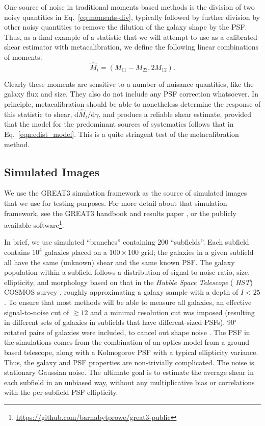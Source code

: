 \documentclass[iop]{emulateapj}
\begin{document}
One source of noise in traditional moments based methods is the
division of two noisy quantities in Eq.~\ref{eq:moments-div},
typically followed by further division by other noisy quantities to
remove the dilution of the galaxy shape by the PSF.  Thus, as a final
example of a statistic that we will attempt to use as a calibrated
shear estimator with metacalibration, we define the following linear
combinations of moments:
\begin{equation}
\hat{M}_i = (M_{11}-M_{22}, 2M_{12}).
\end{equation}

Clearly these moments are sensitive to a number of nuisance
quantities, like the galaxy flux and size.  They also do not include
any PSF correction whatsoever.  In principle, metacalibration should
be able to nonetheless determine the response of this statistic to
shear, $\mathrm{d}\hat{M}_i/\mathrm{d}\gamma$, and produce a reliable
shear estimate, provided that the model for the predominant sources of
systematics follows that in Eq.~\ref{eqn:edist_model}.  This is a
quite stringent test of the metacalibration method.

\subsection{Simulated Images}

We use the GREAT3 simulation framework as the source of simulated
images that we use for testing purposes.  For more detail about that
simulation framework, see the GREAT3 handbook
\citep{2014ApJS..212....5M} and results paper
\citep{2015MNRAS.450.2963M}, or the publicly available
software\footnote{\url{https://github.com/barnabytprowe/great3-public}}.

In brief, we use simulated ``branches'' containing 200 ``subfields''.
Each subfield contains $10^4$ galaxies placed on a $100\times 100$
grid; the galaxies in a given subfield all have the same (unknown)
shear and the same known PSF.  The galaxy population within a subfield
follows a distribution of signal-to-noise ratio, size, ellipticity,
and morphology based on that in the {\it Hubble Space Telescope} ({\it
  HST}) COSMOS survey
\citep{2007ApJS..172..196K,2007ApJS..172....1S,2007ApJS..172...38S},
roughly approximating a galaxy sample with a depth of $I<25$.  To
ensure that most methods will be able to measure all galaxies, an
effective signal-to-noise cut of $\gtrsim 12$ and a minimal resolution
cut was imposed (resulting in different sets of galaxies in subfields
that have different-sized PSFs).  90$^\circ$ rotated pairs of galaxies
were included, to cancel out shape noise \citep{2007MNRAS.376...13M}.
The PSF in the simulations comes from the combination of an optics
model from a ground-based telescope, along with a Kolmogorov PSF with
a typical ellipticity variance.  Thus, the galaxy and PSF properties
are non-trivially complicated.  The noise is stationary Gaussian
noise.  The ultimate goal is to estimate the average shear in each
subfield in an unbiased way, without any multiplicative bias or
correlations with the per-subfield PSF ellipticity.
\end{document}
